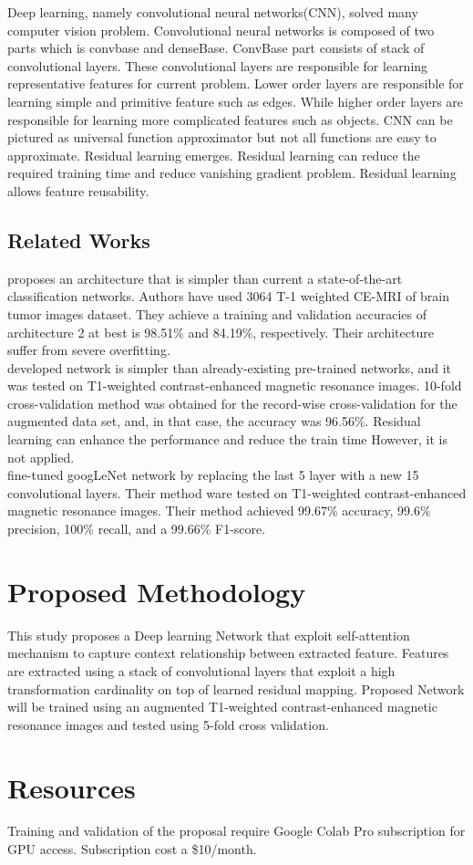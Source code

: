 \documentclass{article}
\begin{document}
Deep learning\cite{lecun2015deep}, namely convolutional neural networks(CNN)\cite{lecun1989handwritten}, solved many computer vision problem. Convolutional neural networks is composed of two parts which is convbase and denseBase. ConvBase part consists of stack of convolutional layers. These convolutional layers are responsible for learning representative features for current problem. Lower order layers are responsible for learning simple and primitive feature such as edges. While higher order layers are responsible for learning more complicated features such as objects. CNN can be pictured as universal function approximator but not all functions are easy to approximate. Residual learning\cite{he2016deep} emerges. Residual learning can  reduce the required training time and reduce vanishing gradient problem. Residual learning allows feature reusability.


\subsection{Related Works}

\cite{abiwinanda2019brain} proposes an architecture that is simpler than current a state-of-the-art classification networks. Authors have used 3064 T-1 weighted
CE-MRI of brain tumor images dataset\cite{cheng2017brain}. They achieve a training
and validation accuracies of architecture 2 at best is 98.51\% and 84.19\%, respectively. Their architecture suffer from severe overfitting.\\
\cite{badvza2020classification} developed network is simpler than already-existing pre-trained networks, and it was tested on T1-weighted contrast-enhanced magnetic resonance images\cite{cheng2017brain}.  10-fold cross-validation method was obtained for the record-wise cross-validation for the augmented data set, and, in that case, the accuracy was 96.56\%. Residual learning\cite{he2016deep} can enhance the performance and reduce the train time However, it is not applied.\\
\cite{raza2022hybrid} fine-tuned googLeNet\cite{szegedy2015going} network by replacing the last 5 layer with a new 15 convolutional layers. Their method ware tested on T1-weighted contrast-enhanced magnetic resonance images\cite{cheng2017brain}. Their method achieved  99.67\% accuracy, 99.6\% precision, 100\% recall, and a 99.66\% F1-score. 

\section{Proposed Methodology}
This study proposes a Deep learning Network that exploit self-attention mechanism \cite{vaswani2017attention} to capture context relationship between extracted feature. Features are extracted using a stack of convolutional layers that exploit a high transformation cardinality\cite{xie2017aggregated} on top of learned residual mapping\cite{he2016deep}. Proposed Network will be trained using an augmented T1-weighted contrast-enhanced magnetic resonance images\cite{cheng2017brain} and tested using 5-fold cross validation. 


\section{Resources}
Training and validation of the proposal require Google Colab Pro subscription for GPU access. Subscription cost a \$10/month.



\end{document}
